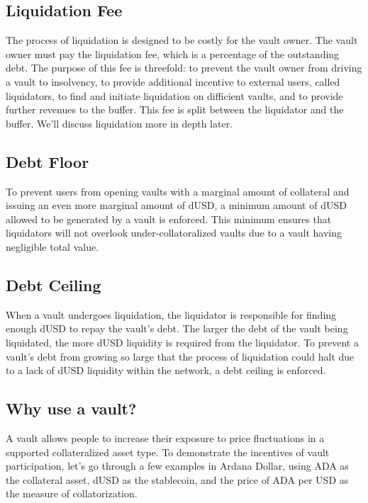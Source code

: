 \documentclass[12pt]{article}
\begin{document}
\subsection{Liquidation Fee}

The process of liquidation is designed to be costly for the vault owner. The vault owner must pay the liquidation fee, which is a percentage of the outstanding debt. The purpose of this fee is threefold: to prevent the vault owner from driving a vault to insolvency, to provide additional incentive to external users, called liquidators, to find and initiate liquidation on difficient vaults, and to provide further revenues to the buffer. This fee is split between the liquidator and the buffer. We'll discuss liquidation more in depth later.

\subsection{Debt Floor}

To prevent users from opening vaults with a marginal amount of collateral and issuing an even more marginal amount of dUSD, a minimum amount of dUSD allowed to be generated by a vault is enforced. This minimum ensures that liquidators will not overlook under-collatoralized vaults due to a vault having negligible total value.

\subsection{Debt Ceiling}

When a vault undergoes liquidation, the liquidator is responsible for finding enough dUSD to repay the vault's debt. The larger the debt of the vault being liquidated, the more dUSD liquidity is required from the liquidator. To prevent a vault's debt from growing so large that the process of liquidation could halt due to a lack of dUSD liquidity within the network, a debt ceiling is enforced.

\subsection{Why use a vault?}

A vault allows people to increase their exposure to price fluctuations in a supported collateralized asset type. To demonstrate the incentives of vault participation, let's go through a few examples in Ardana Dollar, using ADA as the collateral asset, dUSD as the stablecoin, and the price of ADA per USD as the measure of collatorization.
\end{document}
